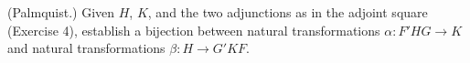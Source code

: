 (Palmquist.) Given $H$, $K$, and the two adjunctions as in the adjoint square (Exercise 4), establish a bijection between natural transformations $\alpha : F'HG \to K$ and natural transformations $\beta : H \to G'KF$.

